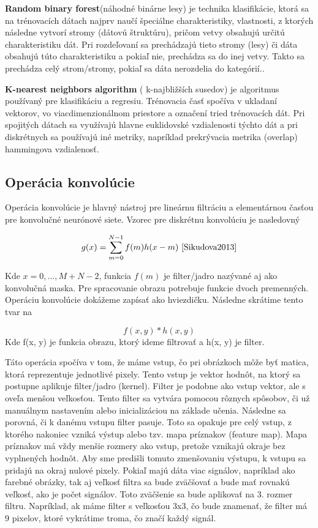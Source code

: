 \hspace{10mm}\textbf{Random binary forest}(náhodné binárne lesy) je technika klasifikácie, ktorá sa na trénovacích dátach najprv naučí špeciálne charakteristiky, vlastnosti, z ktorých následne vytvorí stromy (dátovú štruktúru), pričom vetvy obsahujú určitú charakteristiku dát. Pri rozdeľovaní sa prechádzajú tieto stromy (lesy) či dáta obsahujú túto charakteristiku a pokiaľ nie, prechádza sa do inej vetvy. Takto sa prechádza celý strom/stromy, pokiaľ sa dáta nerozdelia do kategórií.. 

\hspace{10mm}\textbf{K-nearest neighbors algorithm} ( k-najbližších susedov) je algoritmus používaný pre klasifikáciu a regresiu. Trénovacia časť spočíva v ukladaní vektorov, vo viacdimenzionálnom priestore a označení tried trénovacích dát. Pri spojitých dátach sa využívajú hlavne euklidovské vzdialenosti týchto dát a pri diskrétnych sa používajú iné metriky, napríklad prekrývacia metrika (overlap) hammingova vzdialenosť.

\subsection{Operácia konvolúcie} \label{konvolucoper}

Operácia konvolúcie je hlavný nástroj pre lineárnu filtráciu a elementárnou časťou pre konvolučné neurónové siete. Vzorec pre diskrétnu konvolúciu je nasledovný

\[g (x) = \sum_{m=0}^{N-1} f (m) h(x -m)\ \cite{Sikudova2013}\]

\hspace{10mm}Kde \(x = 0,..., M + N - 2\), funkcia \(f(m)\) je filter/jadro nazývané aj ako konvolučná maska. Pre spracovanie obrazu potrebuje funkcie dvoch premenných. Operáciu konvolúcie dokážeme zapísať ako hviezdičku. Následne skrátime tento tvar na 

\[f(x,y)*h(x,y)\]
\hspace{10mm}Kde f(x, y) je funkcia obrazu, ktorý ideme filtrovať a h(x, y) je filter.

\hspace{10mm}Táto operácia spočíva v tom, že máme vstup, čo pri obrázkoch môže byť matica, ktorá  reprezentuje jednotlivé pixely. Tento vstup je vektor hodnôt, na ktorý sa postupne aplikuje filter/jadro (kernel). Filter je podobne ako vstup vektor, ale s oveľa menšou veľkosťou. Tento filter sa vytvára pomocou rôznych spôsobov, či už manuálnym nastavením alebo inicializáciou na základe učenia. Následne sa porovná, či k danému vstupu filter pasuje. Toto sa opakuje pre celý vstup, z ktorého nakoniec vzniká výstup alebo tzv. mapa príznakov (feature map). Mapa príznakov má vždy menšie rozmery ako vstup, pretože vznikajú okraje bez vyplnených hodnôt. Aby sme predišli tomuto zmenšovaniu výstupu, k vstupu sa pridajú na okraj nulové pixely. Pokiaľ majú dáta viac signálov, napríklad ako farebné obrázky, tak aj veľkosť filtra sa bude zväčšovať a bude mať rovnakú veľkosť, ako je počet signálov. Toto zväčšenie sa bude aplikovať na 3. rozmer filtru. Napríklad, ak máme filter s veľkosťou 3x3, čo bude znamenať, že filter má 9 pixelov, ktoré vykrátime troma, čo značí každý signál.


